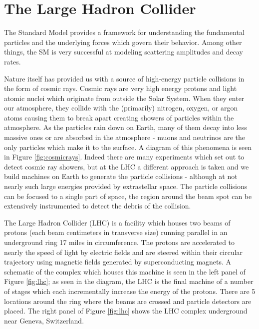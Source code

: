 \chapter{The Large Hadron Collider}
\label{chap:lhc}

The Standard Model provides a framework for understanding the fundamental particles and the underlying forces which govern their behavior. Among other things, the SM is very successful at modeling scattering amplitudes and decay rates. 

Nature itself has provided us with a source of high-energy particle collisions in the form of cosmic rays. Cosmic rays are very high energy protons and light atomic nuclei which originate from outside the Solar System. When they enter our atmosphere, they collide with the (primarily) nitrogen, oxygen, or argon atoms causing them to break apart creating showers of particles within the atmosphere. As the particles rain down on Earth, many of them decay into less massive ones or are absorbed in the atmosphere - muons and neutrinos are the only particles which make it to the surface. A diagram of this phenomena is seen in Figure \ref{fig:cosmicrays}. Indeed there are many experiments which set out to detect cosmic ray showers, but at the LHC a different approach is taken and we build machines on Earth to generate the particle collisions - although at not nearly such large energies provided by extrastellar space. The particle collisions can be focused to a single part of space, the region around the beam spot can be extensively instrumented to detect the debris of the collision. 

The Large Hadron Collider (LHC) is a facility which houses two beams of protons (each beam centimeters in transverse size) running parallel in an underground ring 17 miles in circumference. The protons are accelerated to nearly the speed of light by electric fields and are steered within their circular trajectory using magnetic fields generated by superconducting magnets. A schematic of the complex which houses this machine is seen in the left panel of Figure \ref{fig:lhc}; as seen in the diagram, the LHC is the final machine of a number of stages which each incrementally increase the energy of the protons. There are 5 locations around the ring where the beams are crossed and particle detectors are placed. The right panel of Figure \ref{fig:lhc} shows the LHC complex underground near Geneva, Switzerland.

\newpage

